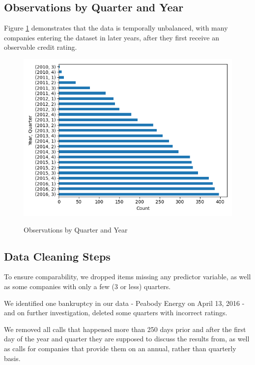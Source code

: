 \documentclass{article}[11pt]
\begin{document}
    \clearpage
    \newpage

    \subsection{Observations by Quarter and Year}

    Figure \ref{fig:obs-by-quarter-year} demonstrates that the data is temporally unbalanced, with many companies entering the dataset in later years, after they first receive an observable credit rating.

    \begin{figure}[h!]
		\centering
        \caption{Observations by Quarter and Year}
        \includegraphics[width=0.6\linewidth,keepaspectratio=true]{../Output/All Data EDA/Tabular EDA/all_data_fixed_quarter_dates_obs_by_year_quarter_no_title.png}
        \label{fig:obs-by-quarter-year}
	\end{figure}

    \clearpage
    \newpage

    \subsection{Data Cleaning Steps}

    \label{sec:data-cleaning}

    To ensure comparability, we dropped items missing any predictor variable, as well as some companies with only a few (3 or less) quarters. 
    
    We identified one bankruptcy in our data - Peabody Energy on April 13, 2016 - and on further investigation, deleted some quarters with incorrect ratings. 
    
    We removed all calls that happened more than 250 days prior and after the first day of the year and quarter they are supposed to discuss the results from, as well as calls for companies that provide them on an annual, rather than quarterly basis.
\end{document}
